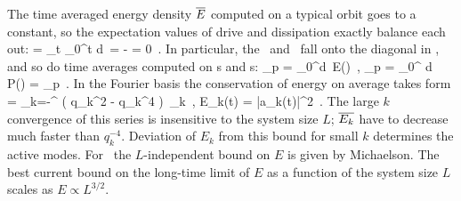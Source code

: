 The time averaged energy density  $\overline{E}$
computed on a typical orbit goes to a constant, so
the expectation values  of drive and dissipation
exactly balance each out:
\beq
      =
    \lim_{t\rightarrow \infty}
         \int_0^t d\tau \, \dot{\expctE}
=
       - 
= 0
    \,.
In particular, the \eqva\
and \reqva\ fall onto the diagonal in ,
and so do time averages computed on \po s and \rpo s:
\beq
{}_p =
 \int_0^d\tau \, E(\tau)
    \,,\qquad
{}_p =
 \int_0^ d\tau \, P(\tau)
    =
      _p
    \,.
\label{poE}
\eeq
In the Fourier basis  the conservation of energy on average
takes form
 = \sum_{k=-\infty}^{\infty} ( q_k^2 - q_k^4 )\,
    _k
\,,\qquad
E_k(t) =  {\textstyle{}} |a_k(t)|^2
\,.
The large $k$ convergence of this series is insensitive to the
system size $L$; $\overline{E_k}$ have to decrease much faster than
$q_k^{-4}$.
Deviation of $E_k$ from this bound for small $k$ determines the active modes.
For \eqva\ the $L$-independent bound
    on $E$ is given by Michaelson.
The best current bound on the long-time limit
of $E$
as a function of the system size $L$ scales as
$E \propto L^{3/2}$.
